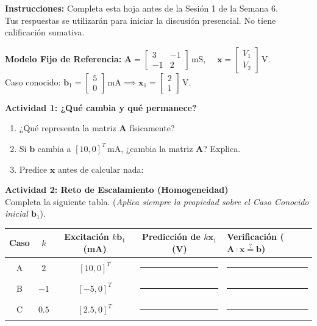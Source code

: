 \documentclass[11pt, a4paper]{article}
\begin{document}
\begin{tcolorbox}[colback=ucbblue!5!white, colframe=ucbblue, title=\textbf{Actividad Formativa: Preparación para Linealidad}]
    \centering \textbf{Instrucciones:} Completa esta hoja antes de la Sesión 1 de la Semana 6.\\Tus respuestas se utilizarán para iniciar la discusión presencial. No tiene calificación sumativa.
\end{tcolorbox}

\noindent \textbf{Modelo Fijo de Referencia:} 
$\bm{A} = \begin{bmatrix} 3 & -1 \\ -1 & 2 \end{bmatrix}\,\text{mS}$, $\quad \bm{x} = \begin{bmatrix} V_1 \\ V_2 \end{bmatrix}\,\text{V}$. \\
Caso conocido: $\bm{b}_1 = \begin{bmatrix} 5 \\ 0 \end{bmatrix}\,\text{mA} \implies \bm{x}_1 = \begin{bmatrix} 2 \\ 1 \end{bmatrix}\,\text{V}$.

\vspace{0.4cm}
\noindent\textbf{Actividad 1: ¿Qué cambia y qué permanece?}
\begin{enumerate}
    \item ¿Qué representa la matriz $\bm{A}$ físicamente? \hrulefill
    \item Si $\bm{b}$ cambia a $[10, 0]^T\,\text{mA}$, ¿cambia la matriz $\bm{A}$? Explica. \hrulefill \\ \hrulefill
    \item Predice $\bm{x}$ antes de calcular nada: \hrulefill
\end{enumerate}

\vspace{0.4cm}
\noindent\textbf{Actividad 2: Reto de Escalamiento (Homogeneidad)} \\
Completa la siguiente tabla. (\textit{Aplica siempre la propiedad sobre el Caso Conocido inicial $\bm{b}_1$}).
\begin{table}[h!]
    \centering
    \renewcommand{\arraystretch}{1.5}
    \begin{tabular}{c c c c l}
    \toprule
    \rowcolor[HTML]{EFEFEF}
    \textbf{Caso} & $k$ & \textbf{Excitación $k\bm{b}_1$} (mA) & \textbf{Predicción de $k\bm{x}_1$} (V) & \textbf{Verificación ($\bm{A}\cdot\bm{x} \stackrel{?}{=} \bm{b}$)} \\ \midrule
    A & $2$ & $[10, 0]^T$ & \rule{3cm}{0.4pt} & \rule{3cm}{0.4pt} \\
    B & $-1$ & $[-5, 0]^T$ & \rule{3cm}{0.4pt} & \rule{3cm}{0.4pt} \\
    C & $0.5$ & $[2.5, 0]^T$ & \rule{3cm}{0.4pt} & \rule{3cm}{0.4pt} \\
    \bottomrule
    \end{tabular}
\end{table}
\end{document}
